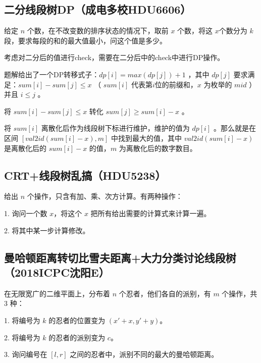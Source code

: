 \documentclass[twoside,a4paper]{article}
\begin{document}
\subsection{二分线段树DP（成电多校HDU6606）}
给定 $n$ 个数，在不改变数的排序状态的情况下，取前 $x$ 个数，将这 $x$个数分为 $k$ 段，要求每段的和的最大值最小，问这个值是多少。\par
考虑对二分后的值进行check，需要在二分后中的check中进行DP操作。\par
题解给出了一个DP转移式子：$dp[i] = max(dp[j]) + 1$ ，其中 $dp[j]$ 要求满足：$sum[i] - sum[j] \leq x$ （ $sum[i]$ 代表第$i$位的前缀和，$x$ 为枚举的 $mid$ ）并且 $i \leq j$ 。\par
将 $sum[i] - sum[j] ≤ x$ 转化 $sum[j] ≥ sum[i] - x$ 。\par
将 $sum[i]$ 离散化后作为线段树下标进行维护，维护的值为 $dp[i]$ 。那么就是在区间 $[val2id(sum[i] - x), m]$ 中找到最大的值，其中 $val2id(sum[i] - x)$ 是离散化后的 $sum[i] - x$ 的值，$m$ 为离散化后的数字数目。


\subsection{CRT+线段树乱搞（HDU5238）}
给出 $n$ 个操作，只含有加、乘、次方计算。有两种操作：\par
1. 询问一个数 $x$，将这个 $x$ 把所有给出需要的计算式来计算一遍。\par
2. 将其中某一步计算修改。\par


\subsection{曼哈顿距离转切比雪夫距离+大力分类讨论线段树（2018ICPC沈阳E）}
在无限宽广的二维平面上，分布着 $n$ 个忍者，他们各自的派别，有 $m$ 个操作，共 $3$ 种：\par
1. 将编号为 $k$ 的忍者的位置变为 $(x'+x, y'+y)$。\par
2. 将编号为 $k$ 的忍者的派别变为 $c$。\par
3. 询问编号在 $[l,r]$ 之间的忍者中，派别不同的最大的曼哈顿距离。\par

\end{document}
